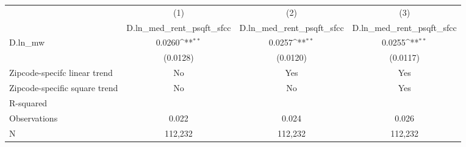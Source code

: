 {
\def\sym#1{\ifmmode^{#1}\else\(^{#1}\)\fi}
\begin{tabular}{l*{3}{c}}
\hline\hline
          &\multicolumn{1}{c}{(1)}&\multicolumn{1}{c}{(2)}&\multicolumn{1}{c}{(3)}\\
          &\multicolumn{1}{c}{D.ln\_med\_rent\_psqft\_sfcc}&\multicolumn{1}{c}{D.ln\_med\_rent\_psqft\_sfcc}&\multicolumn{1}{c}{D.ln\_med\_rent\_psqft\_sfcc}\\
\hline
D.ln\_mw   &   0.0260\sym{**} &   0.0257\sym{**} &   0.0255\sym{**} \\
          & (0.0128)         & (0.0120)         & (0.0117)         \\
\hline
Zipcode-specifc linear trend&       No         &      Yes         &      Yes         \\
Zipcode-specific square trend&       No         &       No         &      Yes         \\
R-squared &                  &                  &                  \\
Observations&    0.022         &    0.024         &    0.026         \\
N         &  112,232         &  112,232         &  112,232         \\
\hline\hline
\end{tabular}
}
